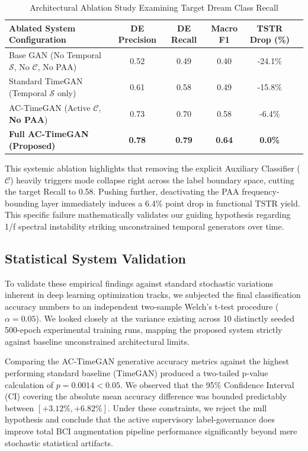 \documentclass[journal,10pt,twocolumn]{IEEEtran}
\begin{document}
\begin{table}[t]
\caption{Architectural Ablation Study Examining Target Dream Class Recall}
\centering
\begin{tabular}{lccccc}
\hline
\textbf{Ablated System Configuration} & \textbf{DE Precision} & \textbf{DE Recall} & \textbf{Macro F1} & \textbf{TSTR Drop (\%)} \\ \hline
Base GAN (No Temporal $\mathcal{S}$, No $\mathcal{C}$, No PAA) & 0.52 & 0.49 & 0.40 & -24.1\% \\ \hline
Standard TimeGAN (Temporal $\mathcal{S}$ only) & 0.61 & 0.58 & 0.49 & -15.8\% \\ \hline
AC-TimeGAN (Active $\mathcal{C}$, \textbf{No PAA}) & 0.73 & 0.70 & 0.58 & -6.4\% \\ \hline
\textbf{Full AC-TimeGAN (Proposed)} & \textbf{0.78} & \textbf{0.79} & \textbf{0.64} & \textbf{0.0\%} \\ \hline
\end{tabular}
\label{tab:ablation}
\end{table}

This systemic ablation highlights that removing the explicit Auxiliary Classifier ($\mathcal{C}$) heavily triggers mode collapse right across the label boundary space, cutting the target Recall to 0.58. Pushing further, deactivating the PAA frequency-bounding layer immediately induces a 6.4\% point drop in functional TSTR yield. This specific failure mathematically validates our guiding hypothesis regarding 1/f spectral instability striking unconstrained temporal generators over time.

\subsection{Statistical System Validation}
To validate these empirical findings against standard stochastic variations inherent in deep learning optimization tracks, we subjected the final classification accuracy numbers to an independent two-sample Welch's t-test procedure ($\alpha = 0.05$). We looked closely at the variance existing across 10 distinctly seeded 500-epoch experimental training runs, mapping the proposed system strictly against baseline unconstrained architectural limits.

Comparing the AC-TimeGAN generative accuracy metrics against the highest performing standard baseline (TimeGAN) produced a two-tailed p-value calculation of $p = 0.0014 < 0.05$. We observed that the 95\% Confidence Interval (CI) covering the absolute mean accuracy difference was bounded predictably between $[+3.12\%, +6.82\%]$. Under these constraints, we reject the null hypothesis and conclude that the active supervisory label-governance does improve total BCI augmentation pipeline performance significantly beyond mere stochastic statistical artifacts.
\end{document}
